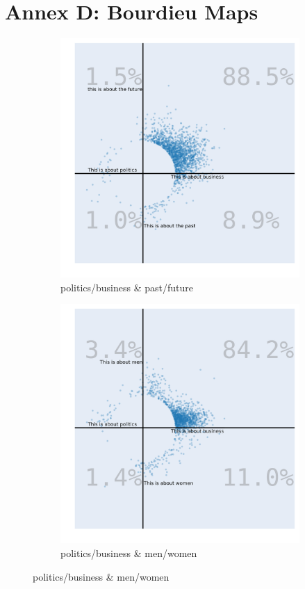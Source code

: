 \documentclass{article}
\begin{document}
\section*{Annex D: Bourdieu Maps}
\begin{figure}[ht]
 \centering
 \begin{subfigure}{0.49\textwidth}
     \centering
     \includegraphics[width=\linewidth]{img/bourdieu/bp_fp.png}
     \caption{politics/business \& past/future}
     \label{fig:a}
 \end{subfigure}
 \hfill
 \begin{subfigure}{0.49\textwidth}
     \centering
     \includegraphics[width=\linewidth]{img/bourdieu/bp_mw.png}
     \caption{politics/business \& men/women}
     \label{fig:b}
 \end{subfigure}
 

\end{figure}
\end{document}
